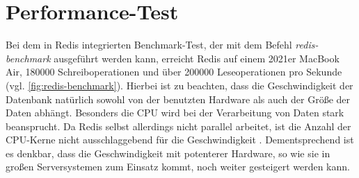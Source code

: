 
\section{Performance-Test}
\label{sec:Performance}
Bei dem in Redis integrierten Benchmark-Test, der mit dem Befehl \textit{redis-benchmark} ausgeführt werden kann, erreicht Redis auf einem 2021er MacBook Air, 180000 Schreiboperationen und über 200000 Leseoperationen pro Sekunde (vgl. \autoref{fig:redis-benchmark}).
Hierbei ist zu beachten, dass die Geschwindigkeit der Datenbank natürlich sowohl von der benutzten Hardware als auch der Größe der Daten abhängt.
Besonders die CPU wird bei der Verarbeitung von Daten stark beansprucht. Da Redis selbst allerdings nicht parallel arbeitet, ist die Anzahl der CPU-Kerne nicht ausschlaggebend für die Geschwindigkeit \cite{Redis-Docs-Benchmarks}.
Dementsprechend ist es denkbar, dass die Geschwindigkeit mit potenterer Hardware, so wie sie in großen Serversystemen zum Einsatz kommt, noch weiter gesteigert werden kann.
